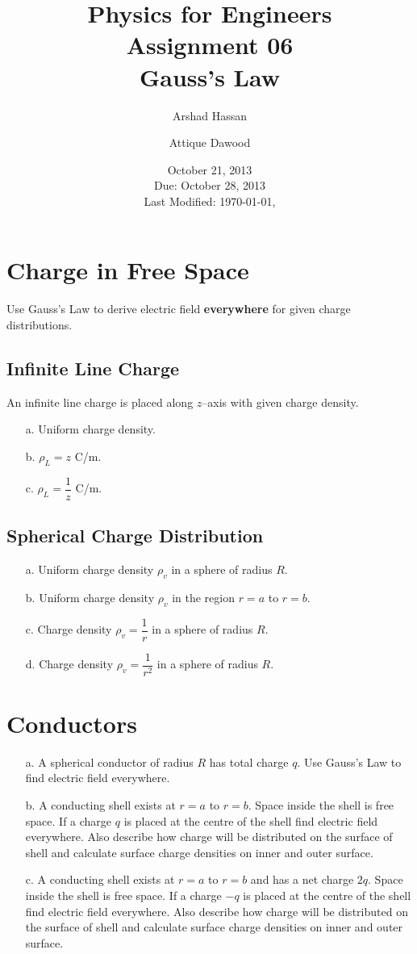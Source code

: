 \documentclass[12pt,a4paper]{article}
\title{\vspace{-3cm}Physics for Engineers\\Assignment 06\\Gauss's Law}
\author{Arshad Hassan\and Attique Dawood}
\date{October 21, 2013\\Due: October 28, 2013\\[0.2cm] Last Modified: \today, \currenttime}
\begin{document}
\maketitle
\section{Charge in Free Space}
Use Gauss's Law to derive electric field \textbf{everywhere} for given charge distributions.
\subsection{Infinite Line Charge}
An infinite line charge is placed along $z$--axis with given charge density.
\begin{itemize}
\item[a.] Uniform charge density.
\item[b.] $\rho_L=z$ C/m.
\item[c.] $\rho_L=\dfrac{1}{z}$ C/m.
\end{itemize}
\subsection{Spherical Charge Distribution}
\begin{itemize}
\item[a.] Uniform charge density $\rho_v$ in a sphere of radius $R$.
\item[b.] Uniform charge density $\rho_v$ in the region $r=a$ to $r=b$.
\item[c.] Charge density $\rho_v=\dfrac{1}{r}$ in a sphere of radius $R$.
\item[d.] Charge density $\rho_v=\dfrac{1}{r^2}$ in a sphere of radius $R$.
\end{itemize}
\section{Conductors}
\begin{itemize}
\item[a.] A spherical conductor of radius $R$ has total charge $q$. Use Gauss's Law to find electric field everywhere.
\item[b.] A conducting shell exists at $r=a$ to $r=b$. Space inside the shell is free space. If a charge $q$ is placed at the centre of the shell find electric field everywhere. Also describe how charge will be distributed on the surface of shell and calculate surface charge densities on inner and outer surface.
\item[c.] A conducting shell exists at $r=a$ to $r=b$ and has a net charge $2q$. Space inside the shell is free space. If a charge $-q$ is placed at the centre of the shell find electric field everywhere. Also describe how charge will be distributed on the surface of shell and calculate surface charge densities on inner and outer surface.
\end{itemize}
%
%
\end{document}
